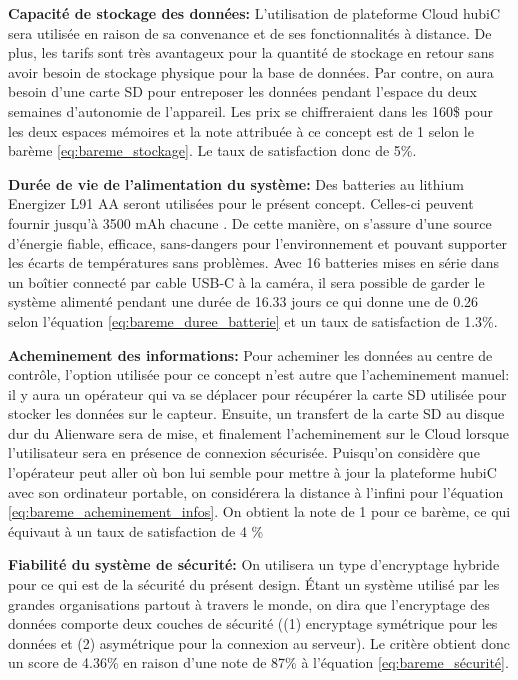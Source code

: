 \textbf{Capacité de stockage des données:}
L’utilisation de plateforme Cloud hubiC sera utilisée en raison de sa convenance et de ses fonctionnalités à distance. De plus, les tarifs sont très avantageux pour la quantité de stockage en retour sans avoir besoin de stockage physique pour la base de données. Par contre, on aura besoin d’une carte SD pour entreposer les données pendant l’espace du deux semaines d’autonomie de l’appareil. Les prix se chiffreraient dans les 160\$ pour les deux espaces mémoires et la note attribuée à ce concept est de 1 selon le barème \ref{eq:bareme_stockage}. Le taux de satisfaction donc de 5\%.
\vspace{5mm}


\textbf{Durée de vie de l’alimentation du système:}
Des batteries au lithium Energizer L91 AA seront utilisées pour le présent concept. Celles-ci peuvent fournir jusqu'à 3500 mAh chacune \cite{Energizer}. De cette manière, on s’assure d’une source d’énergie fiable, efficace, sans-dangers pour l’environnement et pouvant supporter les écarts de températures sans problèmes. Avec 16 batteries mises en série dans un boîtier connecté par cable USB-C à la caméra, il sera possible de garder le système alimenté pendant une durée de 16.33 jours ce qui donne une de 0.26 selon l'équation \ref{eq:bareme_duree_batterie} et un taux de satisfaction de 1.3\%.
\vspace{5mm}


\textbf{Acheminement des informations:} Pour acheminer les données au centre de contrôle, l’option utilisée pour ce concept n’est autre que l’acheminement manuel: il y aura un opérateur qui va se déplacer pour récupérer la carte SD utilisée pour stocker les données sur le capteur. Ensuite, un transfert de la carte SD au disque dur du Alienware sera de mise, et finalement l'acheminement sur le Cloud lorsque l'utilisateur sera en présence de connexion sécurisée. Puisqu'on considère que l'opérateur peut aller où bon lui semble pour mettre à jour la plateforme hubiC avec son ordinateur portable, on considérera la distance à l'infini pour l'équation \ref{eq:bareme_acheminement_infos}. On obtient la note de 1 pour ce barème, ce qui équivaut à un taux de satisfaction de 4 \%
\vspace{5mm}

\textbf{Fiabilité du système de sécurité:}
On utilisera un type d’encryptage hybride pour ce qui est de la sécurité du présent design. Étant un système utilisé par les grandes organisations partout à travers le monde, on dira que l’encryptage des données comporte deux couches de sécurité ((1) encryptage symétrique pour les données et (2) asymétrique pour la connexion au serveur). Le critère obtient donc un score de 4.36\% en raison d'une note de 87\% à l'équation \ref{eq:bareme_sécurité}.
\vspace{5mm}


